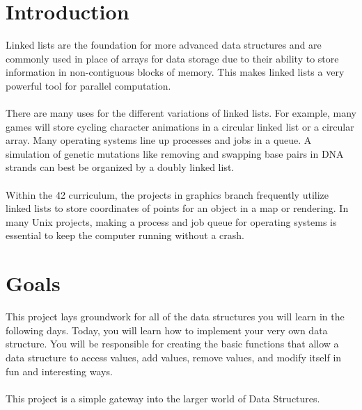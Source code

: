 \documentclass{42-en}
\begin{document}
\chapter{Introduction}
    Linked lists are the foundation for
    more advanced data structures and are commonly used in place of arrays
    for data storage due to their ability to store information in
    non-contiguous blocks of memory. This makes linked lists a very powerful
    tool for parallel computation.\\
    \\
    There are many uses for the different variations of linked lists.
    For example, many games will store cycling character animations in a circular linked
    list or a circular array. Many operating systems line up processes and 
    jobs in a queue. A simulation of genetic mutations like removing and swapping base pairs in DNA strands can best
    be organized by a doubly linked list.\\
    \\
    Within the 42 curriculum, the projects in graphics branch frequently utilize
    linked lists to store coordinates of points for an object in a map or
    rendering. In many Unix projects, making a process and job queue for
    operating systems is essential to keep the computer running without a crash.



\chapter{Goals}
    This project lays groundwork for all of the data structures you will learn
    in the following days. Today, you will learn how to implement your very own
    data structure. You will be responsible for creating the basic functions
    that allow a data structure to access values, add values, remove values, and
    modify itself in fun and interesting ways.\\
    \\
    This project is a simple gateway into the larger world of Data Structures.

\end{document}
